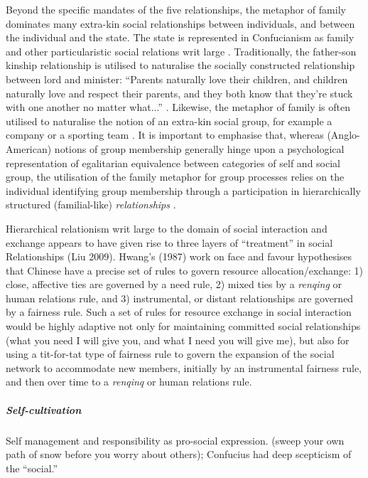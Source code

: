 \begin{CJK}{UTF8}{gbsn}
Beyond the specific mandates of the five relationships, the metaphor of family dominates many extra-kin social relationships between individuals, and between the individual and the state. The state is represented in Confucianism as family and other particularistic social relations writ large \citep[579]{Liu2009}.  Traditionally, the father-son kinship relationship is utilised to naturalise the socially constructed relationship between lord and minister: ``Parents naturally love their children, and children naturally love and respect their parents, and they both know that they're stuck with one another no matter what...'' \citep[178]{Slingerland2014}. Likewise, the metaphor of family is often utilised to naturalise the notion of an extra-kin social group, for example a company or a sporting team \citep{Brownell2008}.
It is important to emphasise that, whereas (Anglo-American) notions of group membership generally hinge upon a psychological representation of egalitarian equivalence between categories of self and social group, the utilisation of the family metaphor for group processes relies on the individual identifying group membership through a participation in hierarchically structured (familial-like) \textit{relationships} \citep{Fei1992}.

Hierarchical relationism writ large to the domain of social interaction and exchange appears to have given rise to three layers of ``treatment'' in social Relationships (Liu 2009).  Hwang’s (1987) work on face and favour hypothesises that Chinese have a precise set of rules to govern resource allocation/exchange: 1) close, affective ties are governed by a need rule, 2) mixed ties by a \textit{renqing} or human relations rule, and 3) instrumental, or distant relationships are governed by a fairness rule.  Such a set of rules for resource exchange in social interaction would be highly adaptive not only for maintaining committed social relationships (what you need I will give you, and what I need you will give me), but also for using a tit-for-tat type of fairness rule to govern the expansion of the social network to accommodate new members, initially by an instrumental fairness rule, and then over time to a \textit{renqinq} or human relations rule.

\subparagraph{Self-cultivation}
Self management and responsibility as pro-social expression.  (sweep your own path of snow before you worry about others); Confucius had deep scepticism of the ``social.''


\end{CJK}
